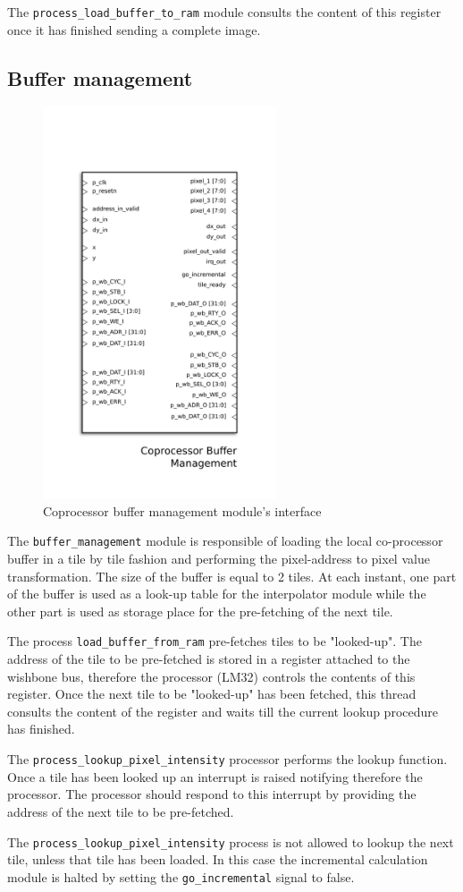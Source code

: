 The \texttt{process\_load\_buffer\_to\_ram} module consults the content of this register once it has finished sending a complete image.

\subsection{Buffer management}

\begin{figure}[H]
\center
\includegraphics[width=6.9cm]{figs/Buffer_management.pdf}
\caption{Coprocessor buffer management module's interface}
\label{buff_out_ports}
\end{figure}


The \texttt{buffer\_management} module is responsible of loading the local co-processor buffer in a tile by tile fashion and performing the pixel-address to pixel value transformation. The size of the buffer is equal to 2 tiles. At each instant, one part of the buffer is used as a look-up table for the interpolator module while the other part is used as storage place for the pre-fetching of the next tile. 

The process \texttt{load\_buffer\_from\_ram} pre-fetches tiles  to be "looked-up". The address of the tile to be pre-fetched is stored in a register attached to the wishbone bus, therefore the processor (LM32) controls the contents of this register. Once the next tile to be "looked-up" has been fetched, this thread consults the content of the register and waits till the current lookup procedure has finished. 

The  \texttt{process\_lookup\_pixel\_intensity}  processor performs the lookup function. Once a tile has been looked up an interrupt is raised notifying therefore the processor. The processor should respond to this interrupt by providing the address of the next tile to be pre-fetched. 

The \texttt{process\_lookup\_pixel\_intensity} process is not allowed to lookup the next tile, unless that tile has been loaded. In this case the incremental calculation module is halted by setting the \texttt{go\_incremental} signal to false.  
